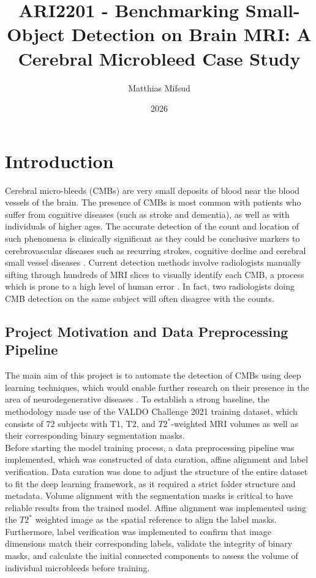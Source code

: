 \documentclass{aifyp}
\title{ARI2201 - Benchmarking Small-Object Detection on Brain MRI: A Cerebral Microbleed Case Study}
\author{Matthias Mifsud}
\date{2026}
\begin{document}
\tableofcontents
\clearpage{\pagestyle{empty}}

\listoffigures
\clearpage{\pagestyle{empty}}

\listoftables
\clearpage{\pagestyle{empty}}

\setcounter{page}{1}


\section{Introduction}
\label{s:intro}

Cerebral micro-bleeds (CMBs) are very small deposits of blood near the blood vessels of the brain. The presence of CMBs is most common with patients who suffer from cognitive diseases (such as stroke and dementia), as well as with individuals of higher ages. The accurate detection of the count and location of such phenomena is clinically significant as they could be conclusive markers to cerebrovascular diseases such as recurring strokes, cognitive decline and cerebral small vessel diseases \cite{cmbDetection}. Current detection methods involve radiologists manually sifting through hundreds of MRI slices to visually identify each CMB, a process which is prone to a high level of human error \cite{valdoPaper}. In fact, two radiologists doing CMB detection on the same subject will often disagree with the counts.\cite{valdoChallenge2021}

\subsection{Project Motivation and Data Preprocessing Pipeline}
The main aim of this project is to automate the detection of CMBs using deep learning techniques, which would enable further research on their presence in the area of neurodegenerative diseases \cite{valdoChallenge2021}. To establish a strong baseline, the methodology made use of the VALDO Challenge 2021 training dataset, which consists of 72 subjects with T1, T2, and $T2^*$-weighted MRI volumes as well as their corresponding binary segmentation masks.\cite{valdoDataset}
\\

Before starting the model training process, a data preprocessing pipeline was implemented, which was constructed of data curation, affine alignment and label verification. Data curation was done to adjust the structure of the entire dataset to fit the deep learning framework, as it required a strict folder structure and metadata. Volume alignment with the segmentation masks is critical to have reliable results from the trained model. Affine alignment was implemented using the $T2^*$ weighted image as the spatial reference to align the label masks. Furthermore, label verification was implemented to confirm that image dimensions match their corresponding labels, validate the integrity of binary masks, and calculate the initial connected components to assess the volume of individual microbleeds before training. 
\end{document}
